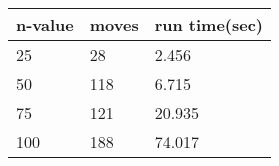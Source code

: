 \documentclass{article}
\begin{document}
\begin{doublespace}
\begin{center}
\begin{tabular}{|l | l | l|}
\hline
	n-value & moves & run time(sec) \\ \hline
	25 & 28 & 2.456 \\ \hline
	50 & 118 & 6.715 \\ \hline
	75 & 121 & 20.935 \\ \hline
	100 & 188 & 74.017 \\ \hline
\hline
\end{tabular}
\end{center}

\newpage





\end{doublespace}
\end{document}
